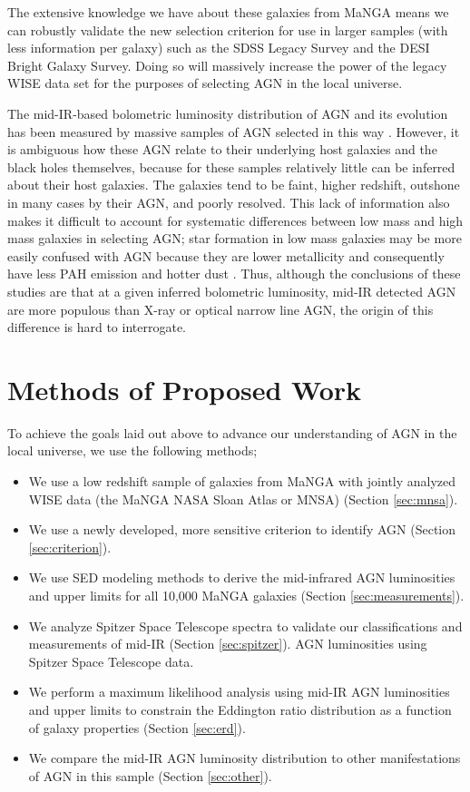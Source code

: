 \documentclass[12pt, preprint]{hacked-aastex}
\begin{document}
The extensive knowledge we have about these galaxies from MaNGA means we 
can robustly validate the new selection criterion for use in larger 
samples (with less information per galaxy) such as the SDSS Legacy 
Survey and the DESI Bright Galaxy Survey. Doing so will massively 
increase the power of the legacy WISE data set for the purposes of 
selecting AGN in the local universe.

The mid-IR-based bolometric luminosity distribution of AGN and its
evolution has been measured by massive samples of AGN selected in this
way \cite{lacy15a}. However, it is ambiguous how these AGN relate to
their underlying host galaxies and the black holes themselves, because
for these samples relatively little can be inferred about their host
galaxies.  The galaxies tend to be faint, higher redshift, outshone in
many cases by their AGN, and poorly resolved.  This lack of
information also makes it difficult to account for systematic
differences between low mass and high mass galaxies in selecting AGN;
star formation in low mass galaxies may be more easily confused with
AGN because they are lower metallicity and consequently have less PAH
emission and hotter dust \cite{hainline16a, sajina22a}. Thus, although
the conclusions of these studies are that at a given inferred
bolometric luminosity, mid-IR detected AGN are more populous than
X-ray or optical narrow line AGN, the origin of this difference is
hard to interrogate.

\section{Methods of Proposed Work\label{sec:methods}}

To achieve the goals laid out above to advance our understanding 
of AGN in the local universe, we use the following methods;
\begin{itemize}
    \item We use a low redshift sample of galaxies from MaNGA with 
    jointly analyzed WISE data (the MaNGA NASA Sloan Atlas or MNSA)
    (Section \ref{sec:mnsa}).
    \item We use a newly developed, more sensitive criterion to 
    identify AGN  (Section \ref{sec:criterion}).
    \item We use SED modeling methods to derive the mid-infrared AGN 
    luminosities and upper limits for all 10,000 MaNGA galaxies
    (Section \ref{sec:measurements}). 
    \item We analyze Spitzer Space Telescope spectra to validate our 
    classifications and measurements of mid-IR (Section
    \ref{sec:spitzer}).
    AGN luminosities using Spitzer Space Telescope data. 
    \item We perform a maximum likelihood analysis using mid-IR AGN luminosities 
     and upper limits to constrain the Eddington ratio  distribution as a 
     function of galaxy properties (Section \ref{sec:erd}).
    \item We compare the mid-IR AGN luminosity distribution to other manifestations 
    of AGN in this sample (Section \ref{sec:other}).
\end{itemize}
\end{document}
